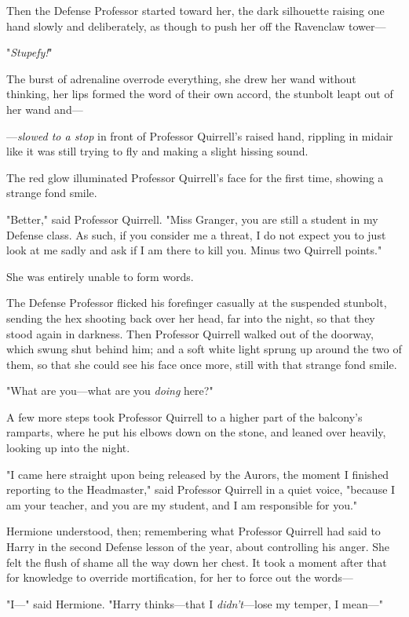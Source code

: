 Then the Defense Professor started toward her, the dark silhouette raising one
hand slowly and deliberately, as though to push her off the Ravenclaw tower---

"\emph{Stupefy!}"

The burst of adrenaline overrode everything, she drew her wand without
thinking, her lips formed the word of their own accord, the stunbolt leapt out
of her wand and---

---\emph{slowed to a stop} in front of Professor Quirrell's raised hand,
rippling in midair like it was still trying to fly and making a slight hissing
sound.

The red glow illuminated Professor Quirrell's face for the first time, showing
a strange fond smile.

"Better," said Professor Quirrell. "Miss Granger, you are still a student in my
Defense class. As such, if you consider me a threat, I do not expect you to
just look at me sadly and ask if I am there to kill you. Minus two Quirrell
points."

She was entirely unable to form words.

The Defense Professor flicked his forefinger casually at the suspended
stunbolt, sending the hex shooting back over her head, far into the night, so
that they stood again in darkness. Then Professor Quirrell walked out of the
doorway, which swung shut behind him; and a soft white light sprung up around
the two of them, so that she could see his face once more, still with that
strange fond smile.

"What are you---what are you \emph{doing} here?"

A few more steps took Professor Quirrell to a higher part of the balcony's
ramparts, where he put his elbows down on the stone, and leaned over heavily,
looking up into the night.

"I came here straight upon being released by the Aurors, the moment I finished
reporting to the Headmaster," said Professor Quirrell in a quiet voice,
"because I am your teacher, and you are my student, and I am responsible for
you."

Hermione understood, then; remembering what Professor Quirrell had said to
Harry in the second Defense lesson of the year, about controlling his anger.
She felt the flush of shame all the way down her chest. It took a moment after
that for knowledge to override mortification, for her to force out the words---

"I---" said Hermione. "Harry thinks---that I \emph{didn't}---lose my temper, I
mean---"


